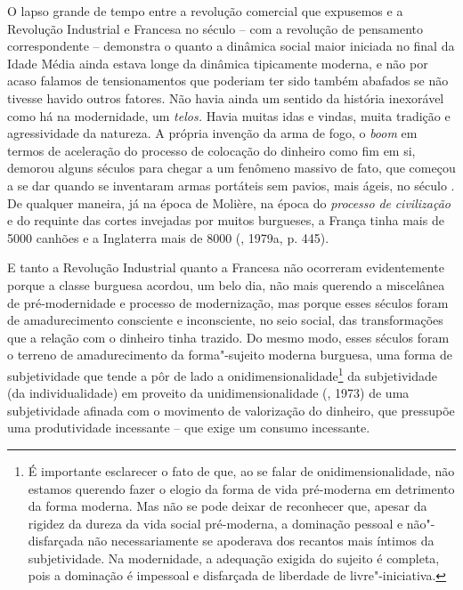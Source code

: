 O lapso grande de tempo entre a revolução comercial que expusemos e a
Revolução Industrial e Francesa no século  -- com a revolução de
pensamento correspondente -- demonstra o quanto a dinâmica social maior
iniciada no final da Idade Média ainda estava longe da dinâmica
tipicamente moderna, e não por acaso falamos de tensionamentos que
poderiam ter sido também abafados se não tivesse havido outros fatores.
Não havia ainda um sentido da história inexorável como há na
modernidade, um \emph{telos.} Havia muitas idas e vindas, muita tradição
e agressividade da natureza. A própria invenção da arma de fogo, o
\emph{boom} em termos de aceleração do processo de colocação do dinheiro
como fim em si, demorou alguns séculos para chegar a um fenômeno massivo
de fato, que começou a se dar quando se inventaram armas portáteis sem
pavios, mais ágeis, no século . De qualquer maneira, já na época de
Molière, na época do \emph{processo} \emph{de} \emph{civilização} e do
requinte das cortes invejadas por muitos burgueses, a França tinha mais
de 5000 canhões e a Inglaterra mais de 8000 (, 1979a, p. 445).

E tanto a Revolução Industrial quanto a Francesa não ocorreram
evidentemente porque a classe burguesa acordou, um belo dia, não mais
querendo a miscelânea de pré-modernidade e processo de modernização, mas
porque esses séculos foram de amadurecimento consciente e inconsciente,
no seio social, das transformações que a relação com o dinheiro tinha
trazido. Do mesmo modo, esses séculos foram o terreno de amadurecimento
da forma"-sujeito moderna burguesa, uma forma de subjetividade que tende
a pôr de lado a onidimensionalidade\footnote{É importante esclarecer o
  fato de que, ao se falar de onidimensionalidade, não estamos querendo
  fazer o elogio da forma de vida pré-moderna em detrimento da forma
  moderna. Mas não se pode deixar de reconhecer que, apesar da rigidez
  da dureza da vida social pré-moderna, a dominação pessoal e
  não"-disfarçada não necessariamente se apoderava dos recantos mais
  íntimos da subjetividade. Na modernidade, a adequação exigida do
  sujeito é completa, pois a dominação é impessoal e disfarçada de
  liberdade de livre"-iniciativa.} da subjetividade (da individualidade)
em proveito da unidimensionalidade (, 1973) de uma subjetividade
afinada com o movimento de valorização do dinheiro, que pressupõe uma
produtividade incessante -- que exige um consumo incessante.

